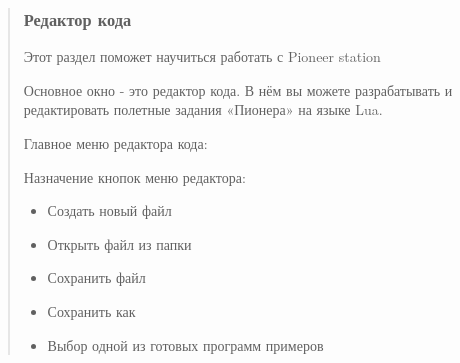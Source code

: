 \documentclass[a4paper,10pt,russian]{sphinxmanual}
\begin{document}
\begin{quote}
\subsubsection{Редактор кода}
\label{\detokenize{programming/pioneer_station/pioneer_station_code_editor:id1}}\label{\detokenize{programming/pioneer_station/pioneer_station_code_editor::doc}}
Этот раздел поможет научиться работать с Pioneer station

Основное окно  - это редактор кода. В нём вы можете разрабатывать и редактировать полетные задания «Пионера» на языке Lua.

Главное меню редактора кода:

\noindent{}

Назначение кнопок меню редактора:
\begin{itemize}
\item {} \begin{description}
\item[{Создать новый файл}] \leavevmode
\noindent{}

\end{description}

\item {} \begin{description}
\item[{Открыть файл из папки}] \leavevmode
\noindent{}

\end{description}

\item {} \begin{description}
\item[{Сохранить файл}] \leavevmode
\noindent{}

\end{description}

\item {} \begin{description}
\item[{Сохранить как}] \leavevmode
\noindent{}

\end{description}

\item {} \begin{description}
\item[{Выбор одной из готовых программ примеров}] \leavevmode
\noindent{}


\end{description}
\end{itemize}
\end{quote}
\end{document}
